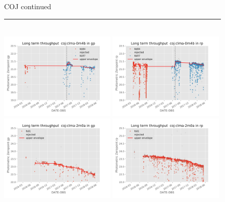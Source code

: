 \documentclass[]{spieman}
\begin{document}
\begin{figure}\ContinuedFloat
\centering 
COJ continued \\ 
\rule{\textwidth}{0.4pt} \\
\includegraphics[width=0.49\textwidth]{images/photzptrend-coj-clma-0m4b-gp.png} \hspace*{\fill}
\includegraphics[width=0.49\textwidth]{images/photzptrend-coj-clma-0m4b-rp.png} \\
\includegraphics[width=0.49\textwidth]{images/photzptrend-coj-clma-2m0a-gp.png} \hspace*{\fill}
\includegraphics[width=0.49\textwidth]{images/photzptrend-coj-clma-2m0a-rp.png} \\ 

\end{figure}
\end{document}
